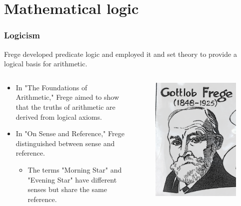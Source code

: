 \documentclass[unicode, 14pt, aspectratio=169]{beamer}
\begin{document}
\section{Mathematical logic}
\begin{frame}
  \frametitle{Logicism}
  {\large Frege developed predicate logic and employed it and set theory to provide a logical basis for arithmetic.}
  \begin{columns}
    \begin{column}{0.8\textwidth}
      \begin{itemize}
        \item In "The Foundations of Arithmetic," Frege aimed to show that the truths of arithmetic are derived from logical axioms.
      \item In "On Sense and Reference," Frege distinguished between sense and reference.
        \begin{itemize}
        \item The terms "Morning Star" and "Evening Star" have different senses but share the same reference.
        \end{itemize}
      \end{itemize}
    \end{column}    
    \begin{column}{0.2\textwidth}
      \begin{figure}
        \includegraphics[width=1\textwidth]{images/frege.png}

\end{figure}
\end{column}
\end{columns}
\end{frame}
\end{document}
